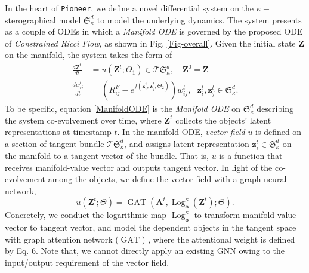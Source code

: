 In the heart of \texttt{Pioneer}, we define a novel differential system on the $\kappa-$sterographical model $\mathfrak{S}^d_\kappa$ to model the underlying dynamics.
The system presents as a couple of ODEs in which a
\emph{Manifold ODE} is governed by the proposed ODE of \emph{Constrained Ricci Flow}, as shown in Fig. \ref{Fig-overall}.
Given the initial state $\boldsymbol{Z}$ on the manifold, the system takes the form of
\begin{align}
\frac{d\boldsymbol{Z}^t}{dt}  &= u(\boldsymbol{Z}^t; \Theta_1)  \in \mathcal T\mathfrak{S}^d_\kappa, \quad  \boldsymbol{Z}^0=\boldsymbol{Z} \label{ManifoldODE}\\
\frac{d{w}_{ij}^t}{dt} & = \left(R^F_{ij}-e^{f(\boldsymbol{z}_i^t, \boldsymbol{z}_j^t; \Theta_2)}\right){w}_{ij}^t, \ \ \ \boldsymbol{z}_i^t, \boldsymbol{z}_j^t \in \mathfrak{S}^d_\kappa. 
\label{NewFlow}
\end{align}
To be specific, 
equation \ref{ManifoldODE} is the \emph{Manifold ODE} on $\mathfrak{S}^d_\kappa$ describing the system co-evolvement over time,
where $\boldsymbol{Z}^t$ collects the objects' latent representations at timestamp $t$.
In the manifold ODE,  
\emph{vector field} $u$ is defined on a section of tangent bundle $\mathcal T\mathfrak{S}^d_\kappa$, 
and assigns latent representation $\boldsymbol z_i^t\in\mathfrak{S}^d_\kappa$ on the manifold to a tangent vector of the bundle.
That is, $u$ is a function that receives manifold-value vector and outputs tangent vector.
In light of the co-evolvement among the objects,
we define the vector field with a graph neural network,
\begin{equation}
u(\boldsymbol{Z}^t; \Theta)=\operatorname{GAT}(\boldsymbol A^t, \operatorname{Log}_{\boldsymbol{o}}^\kappa(\boldsymbol Z^t);\Theta).
\label{VectorField}
\end{equation}
Concretely, we conduct the logarithmic map
$\operatorname{Log}_{\boldsymbol{o}}^\kappa$ to transform manifold-value vector to tangent vector, 
and model the dependent objects in the tangent space with graph attention network ($\operatorname{GAT}$) \cite{nips18gat}, 
where the attentional weight is defined by Eq. 6.
Note that, we cannot directly apply an existing GNN owing to the input/output requirement of the vector field. 

